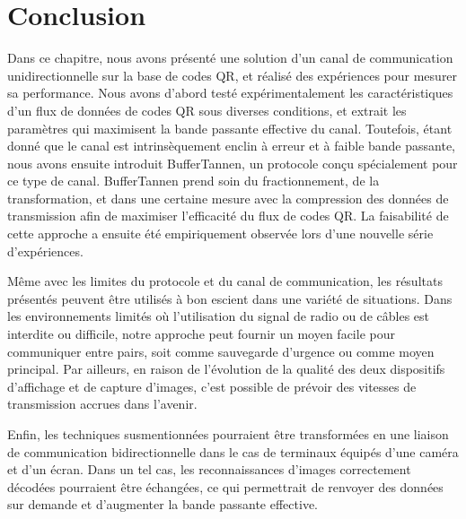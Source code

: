 
\section{Conclusion}\label{sec:qr:conclusion} %

Dans ce chapitre, nous avons présenté une solution d'un canal de communication unidirectionnelle sur la base de codes QR, et réalisé des expériences pour mesurer sa performance. Nous avons d'abord testé expérimentalement les caractéristiques d'un flux de données de codes QR sous diverses conditions, et extrait les paramètres qui  maximisent la bande passante effective du canal. Toutefois, étant donné que le canal est intrinsèquement enclin à erreur et à faible bande passante, nous avons ensuite introduit BufferTannen, un protocole conçu spécialement pour ce type de canal. BufferTannen prend soin du fractionnement, de la transformation, et dans une certaine mesure avec la compression des données de transmission afin de maximiser l'efficacité du flux de codes QR. La faisabilité de cette approche a ensuite été empiriquement observée lors d'une nouvelle série d'expériences.

Même avec les limites du protocole et du canal de communication, les résultats présentés peuvent être utilisés à bon escient dans une variété de situations. Dans les environnements limités où l'utilisation du signal de radio ou de câbles est interdite ou difficile, notre approche peut fournir un moyen facile pour communiquer entre pairs, soit comme sauvegarde d'urgence ou comme moyen principal. Par ailleurs, en raison de l'évolution de la qualité des deux dispositifs d'affichage et de capture d'images, c'est possible de prévoir des vitesses de transmission accrues dans l'avenir.

Enfin, les techniques susmentionnées pourraient être transformées en une liaison de communication bidirectionnelle dans le cas de terminaux équipés d'une caméra et d'un écran. Dans un tel cas, les reconnaissances d'images correctement décodées pourraient être échangées, ce qui permettrait de renvoyer des données sur demande et d'augmenter la bande passante effective.

